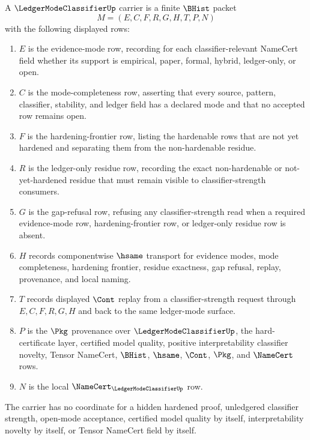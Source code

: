 \begin{definition}
\label{def:ledger-mode-classifier-carrier}
A $\LedgerModeClassifierUp$ carrier is a finite $\BHist$ packet
$$
M=(E,C,F,R,G,H,T,P,N)
$$
with the following displayed rows:
\begin{enumerate}
\item $E$ is the evidence-mode row, recording for each classifier-relevant NameCert field whether its support is empirical, paper, formal, hybrid, ledger-only, or open.
\item $C$ is the mode-completeness row, asserting that every source, pattern, classifier, stability, and ledger field has a declared mode and that no accepted row remains open.
\item $F$ is the hardening-frontier row, listing the hardenable rows that are not yet hardened and separating them from the non-hardenable residue.
\item $R$ is the ledger-only residue row, recording the exact non-hardenable or not-yet-hardened residue that must remain visible to classifier-strength consumers.
\item $G$ is the gap-refusal row, refusing any classifier-strength read when a required evidence-mode row, hardening-frontier row, or ledger-only residue row is absent.
\item $H$ records componentwise $\hsame$ transport for evidence modes, mode completeness, hardening frontier, residue exactness, gap refusal, replay, provenance, and local naming.
\item $T$ records displayed $\Cont$ replay from a classifier-strength request through $E,C,F,R,G,H$ and back to the same ledger-mode surface.
\item $P$ is the $\Pkg$ provenance over $\LedgerModeClassifierUp$, the hard-certificate layer, certified model quality, positive interpretability classifier novelty, Tensor NameCert, $\BHist$, $\hsame$, $\Cont$, $\Pkg$, and $\NameCert$ rows.
\item $N$ is the local $\NameCert_{\LedgerModeClassifierUp}$ row.
\end{enumerate}
The carrier has no coordinate for a hidden hardened proof, unledgered classifier strength, open-mode acceptance, certified model quality by itself, interpretability novelty by itself, or Tensor NameCert field by itself.
\end{definition}


